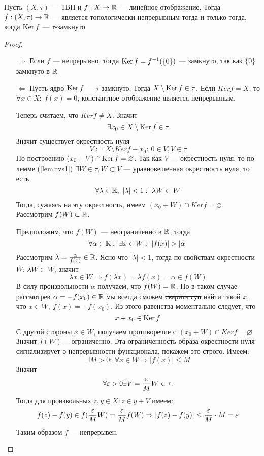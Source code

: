 {\footnotesize \color{violet}
\begin{lemma}
	Пусть $(X, \tau)$ --- ТВП и $f: X \rightarrow \mathbb{R}$ --- линейное отображение. Тогда $f: (X, \tau) \rightarrow \mathbb{R}$ --- является топологически непрерывным тогда и только тогда, когда $\operatorname{Ker} f $ --- $\tau$-замкнуто
\end{lemma}
\begin{proof}
	\hfill
	\begin{enumerate}
		\item[$\Rightarrow$] Если $f$ --- непрерывно, тогда $\operatorname{Ker} f = f^{-1}(\{0\})$ --- замкнуто, так как $\{0\}$ замкнуто в $\mathbb{R}$ 
		\item[$\Leftarrow$] Пусть ядро $\operatorname{Ker} f$ --- $\tau$-замкнуто. Тогда $ X \setminus \operatorname{Ker} f \in \tau$. Если $Ker f  = X$, то $\forall x \in X : \ f(x) = 0$, константное отображение является непрерывным. 
		
		Теперь считаем, что $Ker f \neq X$. Значит 
		$$
		\exists x_0 \in X \setminus \operatorname{Ker} f \in \tau
		$$
		Значит существует окрестность нуля $$V:= X\setminus Ker f - x_0: \  0 \in V, V \in \tau$$ По построению $(x_0 + V) \cap \operatorname{Ker} f = \varnothing$. Так как $V$ --- окрестность нуля, то по лемме (\ref{lem:tvs1}) $\exists W \in \tau, W \subset V$ --- уравновешенная окрестность нуля, то есть 
		$$\forall \lambda\in \R, \ |\lambda| < 1:\ \lambda W \subset W$$
		Тогда, сужаясь на эту окрестность, имеем $(x_0 + W)\cap Ker f = \varnothing$. Рассмотрим $f(W) \subset \mathbb{R}$.
		
		Предположим, что $f(W)$ --- неограниченно в $\mathbb{R}$, тогда 
		$$
		\forall \alpha \in \R : \ \exists x \in W : \ |f(x)| > |\alpha|
		$$
		Рассмотрим $\lambda = \frac{\alpha}{f(x)} \in \mathbb{R}$. Ясно что $|\lambda| < 1$, тогда по свойствам окрестности $W$: $\lambda W \subset W$, значит 
		$$
		\lambda x \in W \Rightarrow f( \lambda x ) = \lambda f(x) = \alpha \in f(W)
		$$
		В силу произвольности $\alpha$ получаем, что $f(W)=\mathbb{R}$. Но в таком случае рассмотрев $\alpha = - f(x_0) \in \mathbb{R}$ мы всегда сможем  \sout{сварить суп} найти такой $x$, что $x \in W, \  f(x) = - f(x_0)$. Из этого равенства моментально следует, что 
		$$
		x + x_0 \in \operatorname{Ker} f
		$$
		С другой стороны $x \in W$, получаем противоречие с $(x_0 + W)\cap Ker f = \varnothing$
		Значит $f(W)$--- ограниченно. Эта ограниченность образа окрестности нуля сигнализирует о непрерывности функционала, покажем это строго. Имеем:
		$$
		\exists M > 0: \ \forall x \in W \Rightarrow |f(x)| \leq M 
		$$
		Значит 
		$$
		\forall \varepsilon > 0 \exists V = \frac{\varepsilon}{M}W \in \tau.
		$$
		Тогда для произвольных $z, y \in X: z \in y + V$ имеем:
		$$
		f(z) - f(y) \in f(\frac{\varepsilon}{M}W) = \frac{\varepsilon}{M}f(W) \Rightarrow |f(z) - f(y)| \leq \frac{\varepsilon}{M}\cdot M = \varepsilon 
		$$
		Таким образом $f$ --- непрерывен. 
	\end{enumerate}
\end{proof}
}
